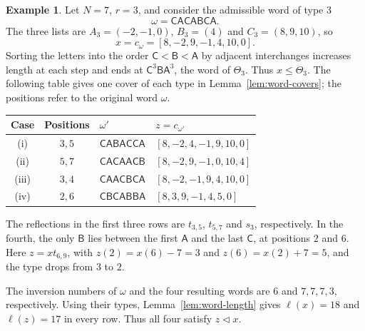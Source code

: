 \documentclass[11pt,a4paper,reqno]{amsart}
\numberwithin{equation}{section}
\theoremstyle{definition}
\newtheorem{example}[theorem]{Example}
\theoremstyle{remark}
\theoremstyle{plain}
\newcommand{\A}{\mathsf A}
\newcommand{\B}{\mathsf B}
\newcommand{\CC}{\mathsf C}
\begin{document}
\begin{example}\label{ex:word-covers}
Let $N=7$, $r=3$, and consider the admissible word of type $3$
\[
 \omega=\CC\A\CC\A\B\CC\A.
\]
The three lists are $A_3=(-2,-1,0)$, $B_3=(4)$ and $C_3=(8,9,10)$,
so
\[
 x=c_\omega=[8,-2,9,-1,4,10,0].
\]
Sorting the letters into the order $\CC<\B<\A$ by adjacent
interchanges increases length at each step and ends at
$\CC^3\B\A^3$, the word of $\Theta_3$. Thus $x\leq\Theta_3$.
The following table gives one cover of each type in
Lemma~\ref{lem:word-covers}; the positions refer to the original word
$\omega$.
\begin{center}\small
\begin{tabular}{@{}ccll@{}}
\toprule
Case & Positions & $\omega'$ & $z=c_{\omega'}$ \\
\midrule
\textup{(i)} & $3,5$ & $\CC\A\B\A\CC\CC\A$
 & $[8,-2,4,-1,9,10,0]$ \\
\textup{(ii)} & $5,7$ & $\CC\A\CC\A\A\CC\B$
 & $[8,-2,9,-1,0,10,4]$ \\
\textup{(iii)} & $3,4$ & $\CC\A\A\CC\B\CC\A$
 & $[8,-2,-1,9,4,10,0]$ \\
\textup{(iv)} & $2,6$ & $\CC\B\CC\A\B\B\A$
 & $[8,3,9,-1,4,5,0]$ \\
\bottomrule
\end{tabular}
\end{center}
The reflections in the first three rows are $t_{3,5}$, $t_{5,7}$
and $s_3$, respectively. In the fourth, the only $\B$ lies between
the first $\A$ and the last $\CC$, at positions $2$ and $6$.
Here $z=xt_{6,9}$, with $z(2)=x(6)-7=3$ and
$z(6)=x(2)+7=5$, and the type drops from $3$ to $2$.

The inversion numbers of $\omega$ and the four resulting words are
$6$ and $7,7,7,3$, respectively. Using their types,
Lemma~\ref{lem:word-length} gives $\ell(x)=18$ and $\ell(z)=17$
in every row. Thus all four satisfy $z\triangleleft x$.
\end{example}
\end{document}
